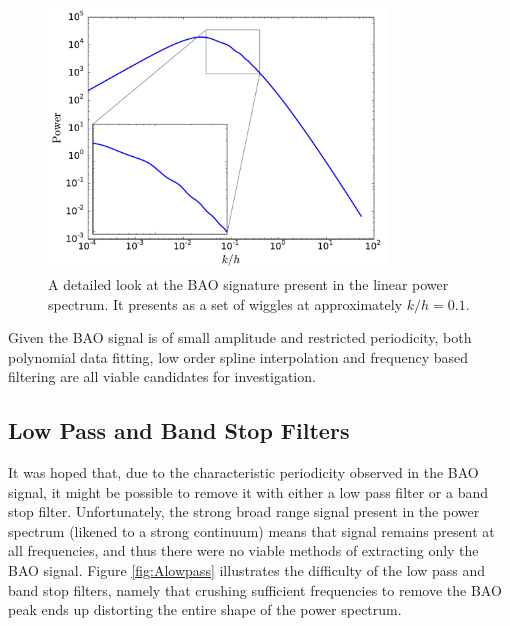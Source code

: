 \documentclass[titlesmallcaps, examinerscopy, copyrightpage]{uqthesis}
\begin{document}
\begin{appendices}
\begin{figure}[h]
  \begin{center}
    \includegraphics[width=0.8\textwidth]{images/Alinear.pdf}
  	\caption{A detailed look at the BAO signature present in the linear power spectrum. It presents as a set of wiggles at approximately $k/h = 0.1$.}
  	\label{fig:Alinear}
  \end{center}
\end{figure}

Given the BAO signal is of small amplitude and restricted periodicity, both polynomial data fitting, low order spline interpolation and frequency based filtering are all viable candidates for investigation.

\subsection{Low Pass and Band Stop Filters}

It was hoped that, due to the characteristic periodicity observed in the BAO signal, it might be possible to remove it with either a low pass filter or a band stop filter. Unfortunately, the strong broad range signal present in the power spectrum (likened to a strong continuum) means that signal remains present at all frequencies, and thus there were no viable methods of extracting only the BAO signal. Figure \ref{fig:Alowpass} illustrates the difficulty of the low pass and band stop filters, namely that crushing sufficient frequencies to remove the BAO peak ends up distorting the entire shape of the power spectrum.


\end{appendices}
\end{document}
